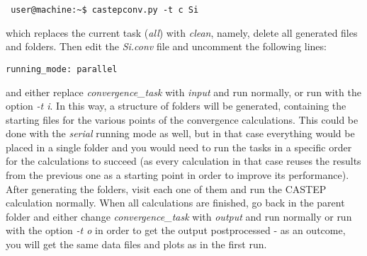 \documentclass[10pt]{article}
\begin{document}
\begin{lstlisting}
 user@machine:~$ castepconv.py -t c Si
\end{lstlisting}

which replaces the current task (\textit{all}) with \textit{clean}, namely, delete all generated files and folders. Then edit the \textit{Si.conv} file and uncomment the following lines:

\begin{lstlisting}
running_mode: parallel
\end{lstlisting}

and either replace \textit{convergence\_task} with \textit{input} and run normally, or run with the option \textit{-t i}. In this way, a structure of folders will be generated, containing the starting files for the various points of the convergence calculations. This could be done with the \textit{serial} running mode as well, but in that case everything would be placed in a single folder and you would need to run the tasks in a specific order for the calculations to succeed (as every calculation in that case reuses the results from the previous one as a starting point in order to improve its performance). After generating the folders, visit each one of them and run the CASTEP calculation normally. When all calculations are finished, go back in the parent folder and either change \textit{convergence\_task} with \textit{output} and run normally or run with the option \textit{-t o} in order to get the output postprocessed - as an outcome, you will get the same data files and plots as in the first run.
\end{document}
